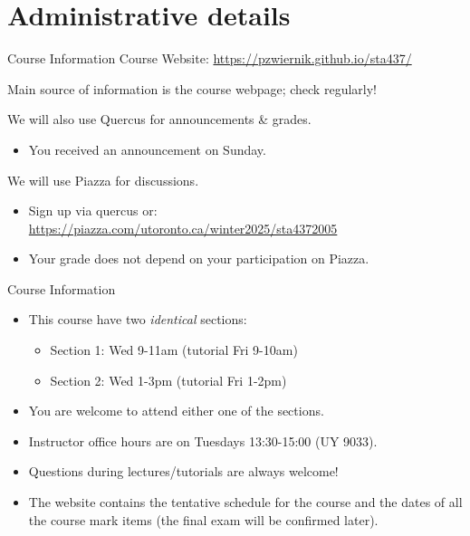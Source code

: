 \documentclass[11pt,handout,aspectratio=169]{beamer}
\begin{document}
\section{Administrative details}
\begin{frame}{Course Information}
Course Website: \url{https://pzwiernik.github.io/sta437/} 

\vspace{.5em}
Main source of information is the course webpage; check regularly!


We will also use \alert{Quercus} for { announcements \& grades}.

\begin{itemize}
\item You received an announcement on Sunday.
\end{itemize}
We will use \alert{Piazza} for {discussions}.
\begin{itemize}
\item Sign up via quercus or: \url{https://piazza.com/utoronto.ca/winter2025/sta4372005}
\item Your grade { does not depend on your participation on Piazza}. 
\end{itemize}
\end{frame}



\begin{frame}{Course Information}
\begin{itemize}
\item This course have two \emph{identical} sections:
  \begin{itemize}
  \item Section 1: Wed 9-11am (tutorial Fri 9-10am)  
  \item Section 2: Wed 1-3pm (tutorial Fri 1-2pm)  
  \end{itemize}
\item You are welcome to attend either one of the sections.
\item Instructor office hours are on Tuesdays 13:30-15:00 (UY 9033).
\item Questions during lectures/tutorials are always welcome!
\item The website contains the tentative schedule for the course and the dates of  all the course mark items (the final exam will be confirmed later). 
\end{itemize}
\end{frame}
\end{document}
